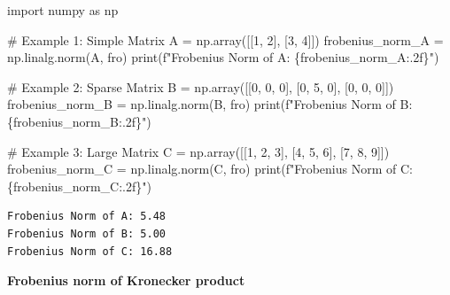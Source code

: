 \documentclass[
  letterpaper,
  DIV=11,
  numbers=noendperiod]{scrreprt}
\newenvironment{Shaded}{\begin{snugshade}}{\end{snugshade}}
\newcommand{\BuiltInTok}[1]{\textcolor[rgb]{0.00,0.23,0.31}{#1}}
\newcommand{\CommentTok}[1]{\textcolor[rgb]{0.37,0.37,0.37}{#1}}
\newcommand{\DecValTok}[1]{\textcolor[rgb]{0.68,0.00,0.00}{#1}}
\newcommand{\ImportTok}[1]{\textcolor[rgb]{0.00,0.46,0.62}{#1}}
\newcommand{\NormalTok}[1]{\textcolor[rgb]{0.00,0.23,0.31}{#1}}
\newcommand{\OperatorTok}[1]{\textcolor[rgb]{0.37,0.37,0.37}{#1}}
\newcommand{\SpecialCharTok}[1]{\textcolor[rgb]{0.37,0.37,0.37}{#1}}
\newcommand{\SpecialStringTok}[1]{\textcolor[rgb]{0.13,0.47,0.30}{#1}}
\newcommand{\StringTok}[1]{\textcolor[rgb]{0.13,0.47,0.30}{#1}}
\theoremstyle{plain}
\theoremstyle{definition}
\theoremstyle{remark}
\begin{document}
\begin{Shaded}
\begin{Highlighting}[]
\ImportTok{import}\NormalTok{ numpy }\ImportTok{as}\NormalTok{ np}

\CommentTok{\# Example 1: Simple Matrix}
\NormalTok{A }\OperatorTok{=}\NormalTok{ np.array([[}\DecValTok{1}\NormalTok{, }\DecValTok{2}\NormalTok{], [}\DecValTok{3}\NormalTok{, }\DecValTok{4}\NormalTok{]])}
\NormalTok{frobenius\_norm\_A }\OperatorTok{=}\NormalTok{ np.linalg.norm(A, }\StringTok{\textquotesingle{}fro\textquotesingle{}}\NormalTok{)}
\BuiltInTok{print}\NormalTok{(}\SpecialStringTok{f"Frobenius Norm of A: }\SpecialCharTok{\{}\NormalTok{frobenius\_norm\_A}\SpecialCharTok{:.2f\}}\SpecialStringTok{"}\NormalTok{)}

\CommentTok{\# Example 2: Sparse Matrix}
\NormalTok{B }\OperatorTok{=}\NormalTok{ np.array([[}\DecValTok{0}\NormalTok{, }\DecValTok{0}\NormalTok{, }\DecValTok{0}\NormalTok{], [}\DecValTok{0}\NormalTok{, }\DecValTok{5}\NormalTok{, }\DecValTok{0}\NormalTok{], [}\DecValTok{0}\NormalTok{, }\DecValTok{0}\NormalTok{, }\DecValTok{0}\NormalTok{]])}
\NormalTok{frobenius\_norm\_B }\OperatorTok{=}\NormalTok{ np.linalg.norm(B, }\StringTok{\textquotesingle{}fro\textquotesingle{}}\NormalTok{)}
\BuiltInTok{print}\NormalTok{(}\SpecialStringTok{f"Frobenius Norm of B: }\SpecialCharTok{\{}\NormalTok{frobenius\_norm\_B}\SpecialCharTok{:.2f\}}\SpecialStringTok{"}\NormalTok{)}

\CommentTok{\# Example 3: Large Matrix}
\NormalTok{C }\OperatorTok{=}\NormalTok{ np.array([[}\DecValTok{1}\NormalTok{, }\DecValTok{2}\NormalTok{, }\DecValTok{3}\NormalTok{], [}\DecValTok{4}\NormalTok{, }\DecValTok{5}\NormalTok{, }\DecValTok{6}\NormalTok{], [}\DecValTok{7}\NormalTok{, }\DecValTok{8}\NormalTok{, }\DecValTok{9}\NormalTok{]])}
\NormalTok{frobenius\_norm\_C }\OperatorTok{=}\NormalTok{ np.linalg.norm(C, }\StringTok{\textquotesingle{}fro\textquotesingle{}}\NormalTok{)}
\BuiltInTok{print}\NormalTok{(}\SpecialStringTok{f"Frobenius Norm of C: }\SpecialCharTok{\{}\NormalTok{frobenius\_norm\_C}\SpecialCharTok{:.2f\}}\SpecialStringTok{"}\NormalTok{)}
\end{Highlighting}
\end{Shaded}

\begin{verbatim}
Frobenius Norm of A: 5.48
Frobenius Norm of B: 5.00
Frobenius Norm of C: 16.88
\end{verbatim}

\textbf{Frobenius norm of Kronecker product}
\end{document}
